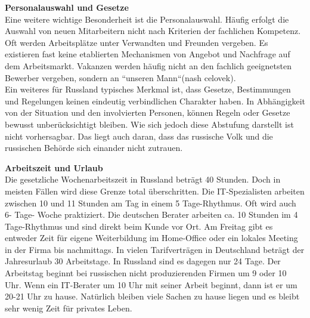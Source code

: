 	\textbf{Personalauswahl und Gesetze}\\
	 Eine weitere wichtige Besonderheit ist die Personalauswahl. Häufig erfolgt die Auswahl von neuen 
	 Mitarbeitern nicht nach Kriterien der fachlichen Kompetenz. Oft werden Arbeitsplätze unter Verwandten und 
	 Freunden vergeben. Es existieren fast keine etablierten Mechanismen von Angebot und Nachfrage auf dem 
	 Arbeitsmarkt. Vakanzen werden häufig nicht an den fachlich geeignetsten Bewerber vergeben, sondern an 
	 ``unseren Mann``(nash celovek).\\
	 Ein weiteres für Russland typisches Merkmal ist, dass Gesetze, Bestimmungen und 
	 Regelungen keinen eindeutig verbindlichen Charakter haben. In Abhängigkeit von der 
	 Situation und den involvierten Personen, können Regeln oder Gesetze bewusst 
	 unberücksichtigt bleiben. Wie sich jedoch diese Abstufung darstellt ist nicht vorhersagbar. Das liegt auch daran, dass das russische Volk und die russischen Behörde sich einander nicht zutrauen.
	 
	 \textbf{Arbeitszeit und Urlaub}\\
	 Die gesetzliche Wochenarbeitszeit in Russland beträgt 40 Stunden. Doch in meisten Fällen wird diese Grenze total überschritten. Die IT-Spezialisten arbeiten zwischen 10 und 11 Stunden am Tag in einem 5 Tage-Rhythmus. Oft wird auch 6- Tage- Woche praktiziert. Die deutschen Berater arbeiten ca. 10 Stunden  im 4 Tage-Rhythmus und sind direkt beim Kunde vor Ort. Am Freitag gibt es entweder Zeit für eigene Weiterbildung im Home-Office oder ein lokales Meeting in der Firma bis nachmittags.
	 In vielen Tarifverträgen in Deutschland beträgt der Jahresurlaub 30 Arbeitstage. In Russland sind es dagegen nur 24 Tage. Der Arbeitstag beginnt bei russischen nicht produzierenden Firmen um 9 oder 10 Uhr. Wenn ein IT-Berater um 10 Uhr mit seiner Arbeit beginnt, dann ist er um 20-21 Uhr zu hause. Natürlich bleiben viele Sachen zu hause liegen und es bleibt sehr wenig Zeit für privates Leben.  %
	 \\
	 

